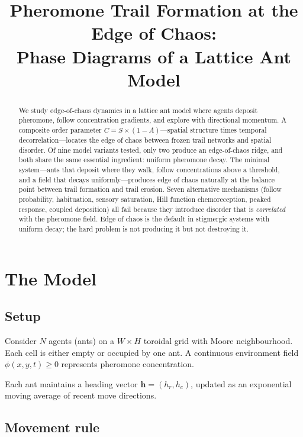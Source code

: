 \documentclass[11pt,a4paper]{article}
\title{Pheromone Trail Formation at the Edge of Chaos:\\
  Phase Diagrams of a Lattice Ant Model}
\author{}
\date{}
\begin{document}
\maketitle

\begin{abstract}
We study edge-of-chaos dynamics in a lattice ant model where agents deposit pheromone, follow concentration gradients, and explore with directional momentum.
A composite order parameter $C = S \times (1 - A)$---spatial structure times temporal decorrelation---locates the edge of chaos between frozen trail networks and spatial disorder.
Of nine model variants tested, only two produce an edge-of-chaos ridge, and both share the same essential ingredient: uniform pheromone decay.
The minimal system---ants that deposit where they walk, follow concentrations above a threshold, and a field that decays uniformly---produces edge of chaos naturally at the balance point between trail formation and trail erosion.
Seven alternative mechanisms (follow probability, habituation, sensory saturation, Hill function chemoreception, peaked response, coupled deposition) all fail because they introduce disorder that is \emph{correlated} with the pheromone field.
Edge of chaos is the default in stigmergic systems with uniform decay; the hard problem is not producing it but not destroying it.
\end{abstract}

\section{The Model}

\subsection{Setup}

Consider $N$ agents (ants) on a $W \times H$ toroidal grid with Moore neighbourhood.
Each cell is either empty or occupied by one ant.
A continuous environment field $\phi(x,y,t) \geq 0$ represents pheromone concentration.

Each ant maintains a heading vector $\mathbf{h} = (h_r, h_c)$, updated as an exponential moving average of recent move directions.

\subsection{Movement rule}
\end{document}
